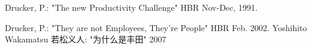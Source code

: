 \documentclass {article}
\begin{document}
\begin{thebibliography}{100}
 Drucker, P.: "The new Productivity Challenge" HBR Nov-Dec, 1991.


 Drucker, P.: "They are not Employees, They're People" HBR Feb. 2002.
 Yoshihito Wakamatsu 若松义人: "为什么是丰田" 2007 


\end{thebibliography}

\end{document}
